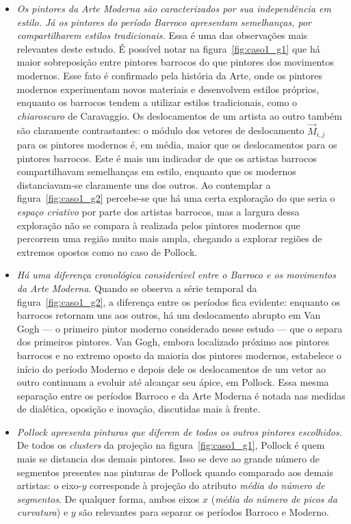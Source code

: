 \begin{itemize}
  \item \textit{Os pintores da Arte Moderna são caracterizados por sua
    independência em estilo. Já os pintores do período Barroco
    apresentam semelhanças, por compartilharem estilos tradicionais.}
    Essa é uma das observações mais relevantes deste estudo. É
    possível notar na figura~\ref{fig:caso1_g1} que há maior
    sobreposição entre pintores barrocos do que pintores dos
    movimentos modernos. Esse fato é confirmado pela história da Arte,
    onde os pintores modernos experimentam novos materiais e
    desenvolvem estilos próprios,
    enquanto os barrocos tendem a utilizar estilos tradicionais, como
    o \textit{chiaroscuro} de Caravaggio. Os deslocamentos de um
    artista ao outro também são claramente contrastantes: o módulo dos
    vetores de deslocamento $\vec{M}_{i,j}$ para os pintores modernos
    é, em média, maior que os deslocamentos para os pintores
    barrocos. Este é mais um indicador de que os artistas barrocos
    compartilhavam semelhanças em estilo, enquanto que os modernos
    distanciavam-se claramente uns dos outros. Ao contemplar a
    figura~\ref{fig:caso1_g2} percebe-se que há uma certa exploração
    do que seria o \textit{espaço criativo} por parte dos artistas
    barrocos, mas a largura dessa exploração não se compara à
    realizada pelos pintores modernos que percorrem uma região muito
    mais ampla, chegando a explorar regiões de extremos opostos como
    no caso de Pollock.

\item \textit{Há uma diferença cronológica considerável entre o
  Barroco e os movimentos da Arte Moderna}. Quando se observa a
  série temporal da figura~\ref{fig:caso1_g2}, a diferença entre os
  períodos fica evidente: enquanto os barrocos retornam uns aos
  outros, há um deslocamento abrupto em Van Gogh --- o primeiro pintor
  moderno considerado nesse estudo --- que o separa dos primeiros
  pintores. Van Gogh, embora localizado próximo aos pintores barrocos
  e no extremo oposto da maioria dos pintores modernos, estabelece o
  início do período Moderno e depois dele os deslocamentos de um vetor
  ao outro continuam a evoluir até alcançar seu ápice, em Pollock. Essa
  mesma separação entre os períodos Barroco e da Arte Moderna é
  notada nas medidas de dialética, oposição e inovação, discutidas
  mais à frente.

  \item \textit{Pollock apresenta pinturas que diferem de todos os
    outros pintores escolhidos.} De todos os \textit{clusters} da
    projeção na figura~\ref{fig:caso1_g1}, Pollock é quem mais se
    distancia dos demais pintores. Isso se deve ao grande número de
    segmentos presentes nas pinturas de Pollock quando comparado aos
    demais artistas: o eixo-$y$ corresponde à projeção do atributo
    \emph{média do número de segmentos}. De qualquer forma, ambos
    eixos $x$ (\emph{média do número de picos da curvatura}) e $y$ são
    relevantes para separar os períodos Barroco e Moderno.


\end{itemize}
